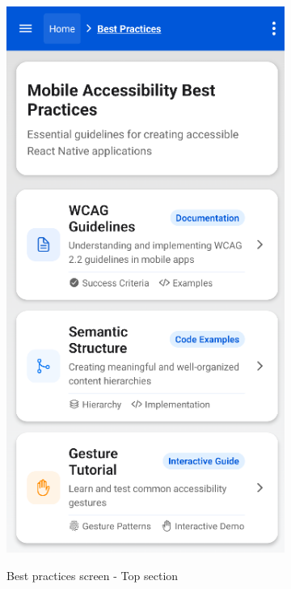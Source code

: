 \begin{figure}[ht]
\begin{subfigure}[b]{0.48\textwidth}
        \includegraphics[width=\linewidth, alt={First part of the Best practices screen}]{img/practices1.png}
        \caption{Best practices screen - Top section}
        \label{fig:best-practices-top}
    \end{subfigure}
    \hfill
    \begin{subfigure}[b]{0.48\textwidth}

\end{subfigure}
\end{figure}
